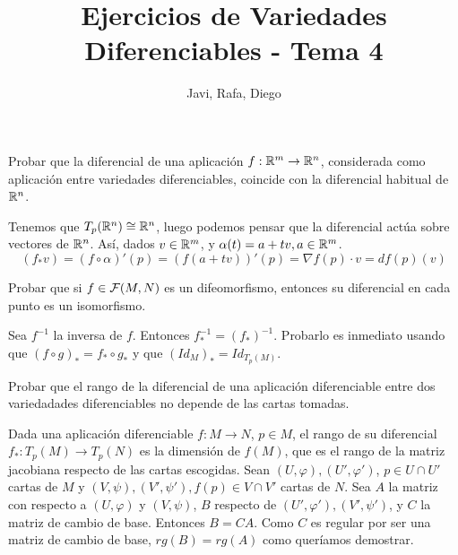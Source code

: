 \documentclass[twoside]{article}
\newcounter{ejercicio}
\begin{document}
\title{Ejercicios de Variedades Diferenciables - Tema 4}
\author{Javi, Rafa, Diego}
\maketitle

\begin{ejercicio}{1}
Probar que la diferencial de una aplicación $f : \mathbb{R}^m \to \mathbb{R}^n$, considerada
como aplicación entre variedades diferenciables, coincide con la diferencial
habitual de $\mathbb{R}^n$.
\end{ejercicio}
\begin{solucion}
Tenemos que $T_p(\mathbb{R}^n)\cong \mathbb{R}^n$, luego podemos pensar que la diferencial actúa sobre vectores de $\mathbb{R}^n$. Así, dados $v\in\mathbb{R}^m$, y $\alpha(t)=a+tv, a\in\mathbb{R}^m$. 
$$(f_*v)=(f\circ \alpha)'(p)=(f(a+tv))'(p)=\nabla f(p)\cdot v=df(p)(v)$$


\end{solucion}

\newpage

\begin{ejercicio}{2}
Probar que si $f \in \mathcal{F}(M,N)$ es un difeomorfismo, entonces su diferencial en
cada punto es un isomorfismo.
\end{ejercicio}
\begin{solucion}
Sea $f^{-1}$ la inversa de $f$. Entonces $f^{-1}_*=(f_*)^{-1}$. Probarlo es inmediato usando que $(f\circ g)_*=f_*\circ g_*$ y que $(Id_M)_*=Id_{T_p(M)}$.
\end{solucion}


\newpage

\begin{ejercicio}{3}
Probar que el rango de la diferencial de una aplicación diferenciable entre
dos variedadades diferenciables no depende de las cartas tomadas.
\end{ejercicio}
\begin{solucion}
Dada una aplicación diferenciable $f:M\to N$, $p\in M$, el rango de su diferencial $f_*:T_p(M)\to T_p(N)$ es la dimensión de $f(M)$, que es el rango de la matriz jacobiana respecto de las cartas escogidas. Sean $(U,\varphi), (U',\varphi')$, $p\in U\cap U'$ cartas de $M$ y $(V,\psi),(V',\psi'),f(p)\in V\cap V'$ cartas de $N$. Sea $A$ la matriz con respecto a $(U,\varphi)$ y $(V,\psi)$, $B$ respecto de $(U',\varphi'),(V',\psi')$, y $C$ la matriz de cambio de base. Entonces $B=CA$. Como $C$ es regular por ser una matriz de cambio de base, $rg(B)=rg(A)$ como queríamos demostrar.
\end{solucion}
\end{document}
